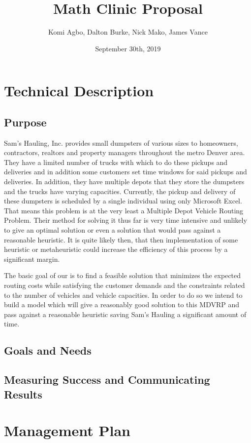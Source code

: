 \documentclass{article}
\title{Math Clinic Proposal}
\author{Komi Agbo, Dalton Burke, Nick Mako, James Vance}
\date{September 30th, 2019}
\begin{document}
\maketitle
\newpage

\section{Technical Description}

\subsection{Purpose}
Sam’s Hauling, Inc. provides small dumpsters of various sizes to homeowners, contractors, realtors and property managers throughout the metro Denver area. They have a limited number of trucks with which to do these pickups and deliveries and in addition some customers set time windows for said pickups and deliveries. In addition, they have multiple depots that they store the dumpsters and the trucks have varying capacities. Currently, the pickup and delivery of these dumpsters is scheduled by a single individual using only Microsoft Excel. That means this problem is at the very least a Multiple Depot Vehicle Routing Problem. Their method for solving it thus far is very time intensive and unlikely to give an optimal solution or even a solution that would pass against a reasonable heuristic. It is quite likely then, that then implementation of some heuristic or metaheuristic could increase the efficiency of this process by a significant margin.

The basic goal of our is to find a feasible solution that minimizes the expected routing costs while satisfying the customer demands and the constraints related to the number of vehicles and vehicle capacities. In order to do so we intend to build a model which will give a reasonably good solution to this MDVRP and pass against a reasonable heuristic saving Sam’s Hauling a significant amount of time.

\subsection{Goals and Needs}

\subsection{Measuring Success and Communicating Results}

\section{Management Plan}
\end{document}

